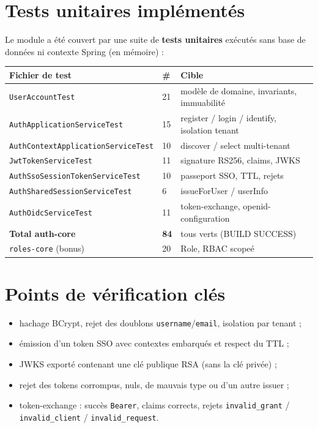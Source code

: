 \documentclass[11pt,a4paper,oneside]{report}
\newcommand{\code}[1]{\texttt{\small #1}}
\begin{document}
\section{Tests unitaires implémentés}
Le module a été couvert par une suite de \textbf{tests unitaires} exécutés sans base de
données ni contexte Spring (en mémoire) :
\begin{center}\small
\begin{tabular}{@{}p{7.4cm}p{2.0cm}p{4.2cm}@{}}
\toprule
\textbf{Fichier de test} & \textbf{\#} & \textbf{Cible}\\
\midrule
\code{UserAccountTest} & 21 & modèle de domaine, invariants, immuabilité\\
\code{AuthApplicationServiceTest} & 15 & register / login / identify, isolation tenant\\
\code{AuthContextApplicationServiceTest} & 10 & discover / select multi-tenant\\
\code{JwtTokenServiceTest} & 11 & signature RS256, claims, JWKS\\
\code{AuthSsoSessionTokenServiceTest} & 10 & passeport SSO, TTL, rejets\\
\code{AuthSharedSessionServiceTest} & 6 & issueForUser / userInfo\\
\code{AuthOidcServiceTest} & 11 & token-exchange, openid-configuration\\
\midrule
\textbf{Total auth-core} & \textbf{84} & tous verts (BUILD SUCCESS)\\
\code{roles-core} (bonus) & 20 & Role, RBAC scopeé\\
\bottomrule
\end{tabular}
\end{center}

\section{Points de vérification clés}
\begin{itemize}[leftmargin=1.4em,itemsep=1pt]
  \item hachage BCrypt, rejet des doublons \code{username}/\code{email}, isolation par tenant ;
  \item émission d'un token SSO avec contextes embarqués et respect du TTL ;
  \item JWKS exporté contenant une clé publique RSA (sans la clé privée) ;
  \item rejet des tokens corrompus, nuls, de mauvais type ou d'un autre issuer ;
  \item token-exchange : succès \code{Bearer}, claims corrects, rejets \code{invalid\_grant} / \code{invalid\_client} / \code{invalid\_request}.
\end{itemize}
\end{document}
